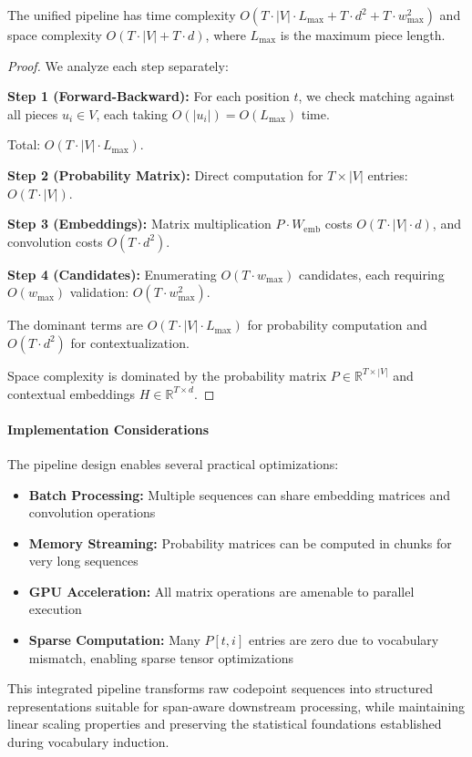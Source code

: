 \begin{proposition}
	The unified pipeline has time complexity \(O(T \cdot |V| \cdot L_{\max} + T \cdot d^2 + T \cdot w_{\max}^2)\) and space complexity \(O(T \cdot |V| + T \cdot d)\), where \(L_{\max}\) is the maximum piece length.
\end{proposition}

\begin{proof}
	We analyze each step separately:
	
	\textbf{Step 1 (Forward-Backward):} For each position \(t\), we check matching against all pieces \(u_i \in V\), each taking \(O(|u_i|) = O(L_{\max})\) time. 
	
	Total: \(O(T \cdot |V| \cdot L_{\max})\).
	
	\textbf{Step 2 (Probability Matrix):} Direct computation for \(T \times |V|\) entries: \(O(T \cdot |V|)\).
	
	\textbf{Step 3 (Embeddings):} Matrix multiplication \(P \cdot W_{\mathrm{emb}}\) costs \(O(T \cdot |V| \cdot d)\), and convolution costs \(O(T \cdot d^2)\).
	
	\textbf{Step 4 (Candidates):} Enumerating \(O(T \cdot w_{\max})\) candidates, each requiring \(O(w_{\max})\) validation: \(O(T \cdot w_{\max}^2)\).
	
	The dominant terms are \(O(T \cdot |V| \cdot L_{\max})\) for probability computation and \(O(T \cdot d^2)\) for contextualization.
	
	Space complexity is dominated by the probability matrix \(P \in \mathbb{R}^{T \times |V|}\) and contextual embeddings \(H \in \mathbb{R}^{T \times d}\).
\end{proof}

\paragraph{Implementation Considerations}

The pipeline design enables several practical optimizations:

\begin{itemize}
	\item \textbf{Batch Processing:} Multiple sequences can share embedding matrices and convolution operations
	\item \textbf{Memory Streaming:} Probability matrices can be computed in chunks for very long sequences
	\item \textbf{GPU Acceleration:} All matrix operations are amenable to parallel execution
	\item \textbf{Sparse Computation:} Many \(P[t,i]\) entries are zero due to vocabulary mismatch, enabling sparse tensor optimizations
\end{itemize}

This integrated pipeline transforms raw codepoint sequences into structured representations suitable for span-aware downstream processing, while maintaining linear scaling properties and preserving the statistical foundations established during vocabulary induction.